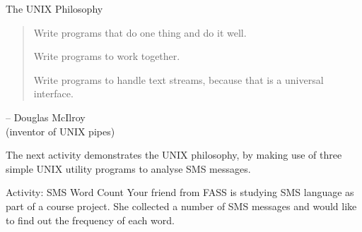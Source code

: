\begin{frame}{The UNIX Philosophy}
\begin{quote}
Write programs that do one thing and do it well.

Write programs to work together.

Write programs to handle text streams, because that is a universal interface.
\end{quote}
\begin{flushright}
-- Douglas McIlroy\\(inventor of UNIX pipes)
\end{flushright}
\end{frame}

The next activity demonstrates the UNIX philosophy, by making use
of three simple UNIX utility programs to analyse SMS messages.  

\begin{frame}{Activity: SMS Word Count}
Your friend from FASS is studying SMS language as part of a course project. She
collected a number of SMS messages and would like to find out the frequency of
each word. 
\end{frame}

